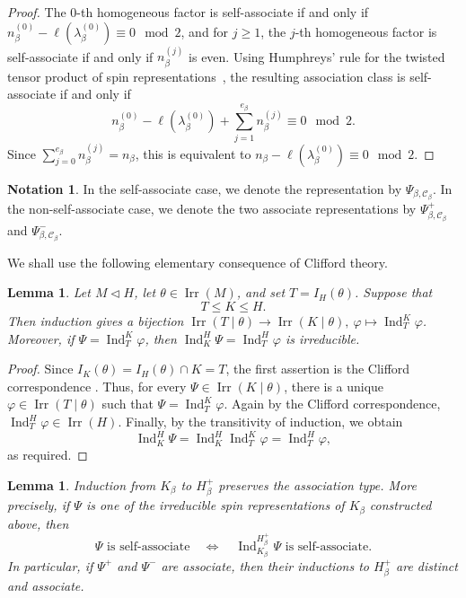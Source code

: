 \documentclass[reqno]{amsart}
\DeclareMathOperator{\Irr}{Irr}
\DeclareMathOperator{\Ind}{Ind}
\newtheorem{lemma}[theorem]{Lemma}     %
\theoremstyle{definition}
\newtheorem{notation}[theorem]{Notation}
\begin{document}
\begin{proof}
The $0$-th homogeneous factor is self-associate if and only if
$n_\beta^{(0)}-\ell(\lambda_\beta^{(0)})\equiv0\mod2$, and for $j\geq1$, the
$j$-th homogeneous factor is self-associate if and only if $n_\beta^{(j)}$ is
even.
Using Humphreys' rule for the twisted tensor product of spin
representations~\cite[Proposition 1.2]{MichlerOlsson}, the resulting
association class is self-associate if and only if
\[
n_\beta^{(0)}-\ell(\lambda_\beta^{(0)})
+
\sum_{j=1}^{e_\beta}n_\beta^{(j)}
\equiv0\mod2.
\]
Since $ \sum_{j=0}^{e_\beta}n_\beta^{(j)}=n_\beta $, this is equivalent to $
n_\beta-\ell(\lambda_\beta^{(0)})\equiv0\mod2$.
\end{proof}

\begin{notation}
In the self-associate case, we denote the representation by
$\Psi_{\beta,\mathcal C_\beta}$. In the non-self-associate case, we denote
the two associate representations by $\Psi_{\beta,\mathcal C_\beta}^+$ and
$\Psi_{\beta,\mathcal C_\beta}^-$.
\end{notation}

We shall use the following elementary consequence of Clifford theory.

\begin{lemma}
\label{lem:intermediate-clifford}
Let $M\triangleleft H$, let $\theta\in\Irr(M)$, and set
$
T=I_H(\theta)$.
Suppose that
\[
T\leq K\leq H.
\]
Then induction gives a bijection $ \Irr(T\mid\theta) \longrightarrow
\Irr(K\mid\theta), \ \varphi\longmapsto\Ind_T^K\varphi$. Moreover, if $
\Psi=\Ind_T^K\varphi $, then $ \Ind_K^H\Psi = \Ind_T^H\varphi $ is
irreducible.
\end{lemma}

\begin{proof}
Since $ I_K(\theta) = I_H(\theta)\cap K = T$, the first assertion is the
Clifford correspondence \cite[Theorem~(6.11)]{isaacs}. Thus, for every
$\Psi\in\Irr(K\mid\theta)$, there is a unique
$\varphi\in\Irr(T\mid\theta)$ such that
$
\Psi=\Ind_T^K\varphi$. 
Again by the Clifford correspondence,
$
\Ind_T^H\varphi\in\Irr(H)
$.
Finally, by the transitivity of induction, we obtain
\[
\Ind_K^H\Psi
=
\Ind_K^H\Ind_T^K\varphi
=
\Ind_T^H\varphi,
\]
as required.
\end{proof}

\begin{lemma}
\label{lem:type-induction}
Induction from $K_\beta$ to $H_\beta^+$ preserves the association type.
More precisely, if $\Psi$ is one of the irreducible spin representations
of $K_\beta$ constructed above, then
\[
\Psi\text{ is self-associate}
\quad\Longleftrightarrow\quad
\Ind_{K_\beta}^{H_\beta^+}\Psi\text{ is self-associate}.
\]
In particular, if $\Psi^+$ and $\Psi^-$ are associate, then their
inductions to $H_\beta^+$ are distinct and associate.
\end{lemma}
\end{document}
